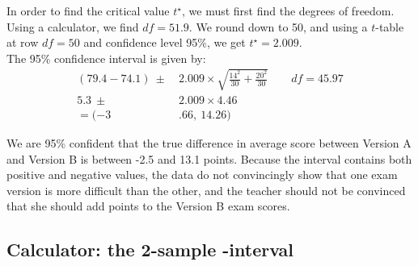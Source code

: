 \begin{examplewrap}
\begin{nexample}
\begin{description}
In order to find the critical value $t^{\star}$, we must first find the degrees of freedom.  Using a calculator, we find $df=51.9$.  We round down to 50, and using a $t$-table at row $df = 50$ and confidence level 95\%, we get $t^{\star} = 2.009$.\\

The 95\% confidence interval is given by:
\begin{align*}
(79.4 - 74.1) \ \pm\  &2.009\times \sqrt{\frac{14^2}{30} + \frac{20^2}{30}}   \qquad df = 45.97\\
5.3 \ \pm\  &2.009\times 4.46 \\
=(-3&.66,\ 14.26)
\end{align*}
\item[\inferencestep{Conclude}]  We are 95\% confident that the true difference in average score between Version A and Version B is between -2.5 and 13.1 points. Because the interval contains both positive and negative values, the data do not convincingly show that one exam version is more difficult than the other, and the teacher should not be convinced that she should add points to the Version B exam scores.

\end{description}
\end{nexample}
\end{examplewrap}


\D{\newpage}

\subsection[Calculator: the 2-sample $t$-interval]{Calculator: the 2-sample -interval}
\label{2SampTint}

